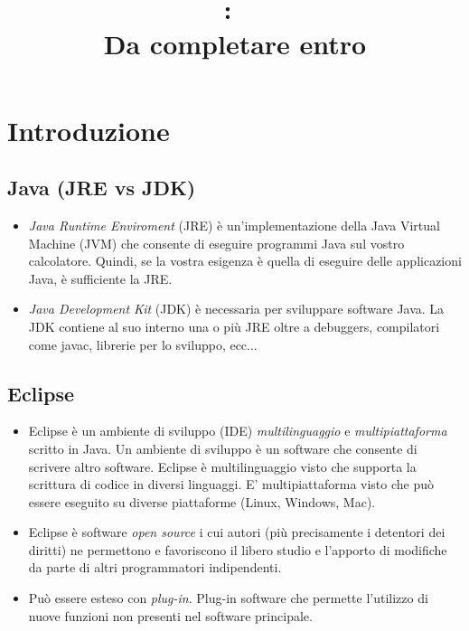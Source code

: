 \documentclass{article}
\title{
\vspace{2in}
\textmd{\textbf{\hmwkClass:\ \hmwkTitle}}\\
\normalsize\vspace{0.1in}\small{Da completare entro \hmwkDueDate}\\
\vspace{0.1in}\large{\textit{\hmwkClassInstructor}}
\vspace{3in}
}
\author{\textbf{\hmwkAuthorName}}
\date{} %
\begin{document}
\maketitle



\newpage
\tableofcontents
\newpage



\section{Introduzione}
\subsection{Java (JRE vs JDK)}
\begin{itemize}
\item \textit{Java Runtime Enviroment} (JRE) \`e un'implementazione della Java Virtual Machine (JVM) che consente di eseguire programmi Java sul vostro calcolatore. Quindi, se la vostra esigenza \`e quella di eseguire delle applicazioni Java, \`e sufficiente la JRE.  
\item  \textit{Java Development Kit} (JDK) \`e necessaria per sviluppare software Java. La JDK contiene al suo interno una o pi\`u JRE oltre a debuggers, compilatori come javac, librerie per lo sviluppo, ecc...
\end{itemize}


\subsection{Eclipse}
\begin{itemize}
\item Eclipse \`e un ambiente di sviluppo (IDE)  \textit{multilinguaggio} e \textit{multipiattaforma} scritto in Java. Un ambiente di sviluppo \` e un software che consente di scrivere altro software. Eclipse \` e multilinguaggio visto che supporta la scrittura di  codice in diversi linguaggi. E' multipiattaforma visto che pu\` o essere eseguito su diverse piattaforme (Linux, Windows, Mac).
\item Eclipse \`e software \textit{open source} i cui autori (pi\`u precisamente i detentori dei diritti) ne permettono e favoriscono il libero studio e l'apporto di modifiche da parte di altri programmatori indipendenti.
\item Pu\`o essere esteso con \textit{plug-in}. Plug-in software che permette l'utilizzo di nuove funzioni non presenti nel software principale.
\end{itemize}
\end{document}
